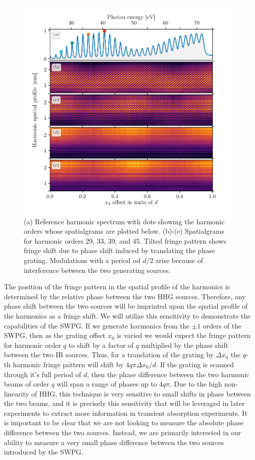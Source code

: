 \begin{figure}
	\centering
	\includegraphics[width=1.0\textwidth]{figures/Two_source/harmonic_spatialgrams.pdf}
	\caption{(a) Reference harmonic spectrum with dots showing the harmonic orders whose spatialgrams are plotted below. (b)-(e) Spatialgrams for harmonic orders 29, 33, 39, and 45.  Tilted fringe pattern shows fringe shift due to phase shift induced by translating the phase grating. Modulations with a period od $d/2$ arise because of interference between the two generating sources.}
	\label{fig:harmonic_spatialgrams}
\end{figure}

The position of the fringe pattern in the spatial profile of the harmonics is determined by the relative phase between the two HHG sources.  Therefore, any phase shift between the two sources will be imprinted upon the spatial profile of the harmonics as a fringe shift.  We will utilize this sensitivity to demonstrate the capabilities of the SWPG.  If we generate harmonics from the $\pm1$ orders of the SWPG, then as the grating offset $x_0$ is varied we would expect the fringe pattern for harmonic order $q$ to shift by a factor of $q$ multiplied by the phase shift between the two IR sources. Thus, for a translation of the grating by $\Delta x_0$ the $q$-th harmonic fringe pattern will shift by $4q\pi\Delta x_0/d$.  If the grating is scanned through it's full period of $d$, then the phase difference between the two harmonic beams of order $q$ will span a range of phases up to $4q\pi$.  Due to the high  non-linearity of HHG, this technique is very sensitive to small shifts in phase between the two beams, and it is precisely this sensitivity that will be leveraged in later experiments to extract more information in transient absorption experiments.  It is important to be clear that we are not looking to measure the absolute phase difference between the two sources.  Instead, we are primarily interested in our ability to measure a very small phase difference between the two sources introduced by the SWPG.

